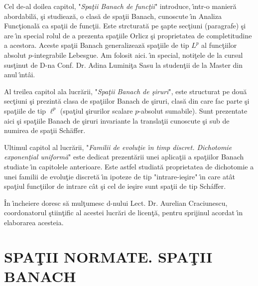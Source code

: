 \documentclass[ a4paper, 12pt]{report}
\theoremstyle{definition}
\theoremstyle{remark}
\numberwithin{equation}{section}
\begin{document}
Cel de-al doilea capitol, "\emph{Spa\c tii Banach de func\c tii}" introduce, \^\i ntr-o manier\u a abordabil\u a, \c si studieaz\u a, o clas\u a de spa\c tii Banach, cunoscute \^\i n Analiza Func\c tional\u a ca spa\c tii de func\c tii. Este strcturat\u a pe \c sapte sec\c tiuni (paragrafe) \c si are \^\i n special rolul de a prezenta spa\c tiile Orlicz \c si proprietatea de completitudine a acestora. Aceste spa\c tii Banach generalizeaz\u a spa\c tiile de tip $L^p$ al func\c tiilor absolut $p$-integrabile Lebesgue. Am folosit aici. \^\i n special, noti\c tele de la cursul sus\c tinut de D-na Conf. Dr. Adina Lumini\c ta Sasu la studen\c tii de la Master din anul \^\i nt\^ ai.

Al treilea capitol ala lucr\u arii, "\emph{Spa\c tii Banach de \c siruri}", este structurat pe dou\u a sec\c tiuni \c si prezint\u a  clasa de spa\c tiilor Banach de \c siruri, clas\u a din care fac parte \c si spa\c tiile de tip $\ell^p$ (spa\c tiul \c sirurilor scalare $p$-absolut sumabile). Sunt prezentate aici \c si spa\c tiile Banach de \c siruri invariante la transla\c tii cunoscute \c si sub de numirea de spa\c tii Sch\" affer.

Ultimul capitol al lucr\u arii, "\emph{Familii de evolu\c tie \^\i n timp discret. Dichotomie exponen\c tial uniform\u a}" este dedicat prezent\u arii unei aplica\c tii a spa\c tiilor Banach studiate \^\i n capitolele anterioare. Este astfel studiat\u a proprietatea de dichotomie a unei familii de evolu\c tie discret\u a \^\i n ipoteze de tip "intrare-ie\c sire" \^\i n care at\^ at spa\c tiul func\c tiilor de intrare c\^ at \c si cel de ie\c sire sunt spa\c tii de tip Sch\' affer.

\^ In \^\i ncheiere doresc s\u a mul\c tumesc d-nului Lect. Dr. Aurelian Craciunescu, coordonatorul \c stiin\c tific al acestei lucr\u ari de licen\c t\u a, pentru sprijinul acordat \^\i n elaborarea acesteia.


\chapter{SPA\c TII NORMATE. SPA\c TII BANACH}
\end{document}
